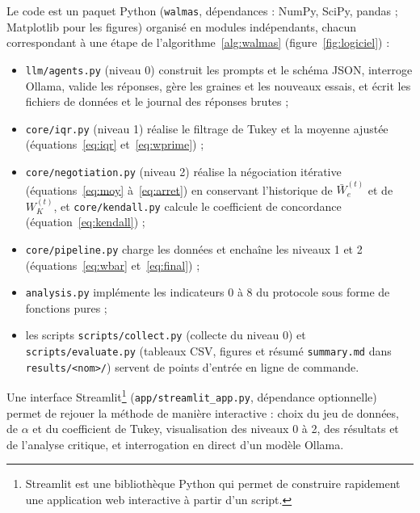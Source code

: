 \documentclass[11pt,a4paper]{article}
\newcommand{\Wbar}{\bar{W}}
\newcommand{\code}[1]{\texttt{#1}}
\begin{document}
Le code est un paquet Python (\code{walmas}, dépendances : NumPy, SciPy, pandas ; Matplotlib pour les figures) organisé en modules indépendants, chacun correspondant à une étape de l'algorithme~\ref{alg:walmas} (figure~\ref{fig:logiciel}) :
\begin{itemize}
  \item \code{llm/agents.py} (niveau 0) construit les prompts et le schéma JSON, interroge Ollama, valide les réponses, gère les graines et les nouveaux essais, et écrit les fichiers de données et le journal des réponses brutes ;
  \item \code{core/iqr.py} (niveau 1) réalise le filtrage de Tukey et la moyenne ajustée (équations~\eqref{eq:iqr} et~\eqref{eq:wprime}) ;
  \item \code{core/negotiation.py} (niveau 2) réalise la négociation itérative (équations~\eqref{eq:moy} à~\eqref{eq:arret}) en conservant l'historique de $\Wbar_e^{(t)}$ et de $W_K^{(t)}$, et \code{core/kendall.py} calcule le coefficient de concordance (équation~\eqref{eq:kendall}) ;
  \item \code{core/pipeline.py} charge les données et enchaîne les niveaux 1 et 2 (équations~\eqref{eq:wbar} et~\eqref{eq:final}) ;
  \item \code{analysis.py} implémente les indicateurs 0 à 8 du protocole sous forme de fonctions pures ;
  \item les scripts \code{scripts/collect.py} (collecte du niveau 0) et \code{scripts/evaluate.py} (tableaux CSV, figures et résumé \code{summary.md} dans \code{results/<nom>/}) servent de points d'entrée en ligne de commande.
\end{itemize}
Une interface Streamlit\footnote{Streamlit est une bibliothèque Python qui permet de construire rapidement une application web interactive à partir d'un script.} (\code{app/streamlit\_app.py}, dépendance optionnelle) permet de rejouer la méthode de manière interactive : choix du jeu de données, de $\alpha$ et du coefficient de Tukey, visualisation des niveaux 0 à 2, des résultats et de l'analyse critique, et interrogation en direct d'un modèle Ollama.
\end{document}
